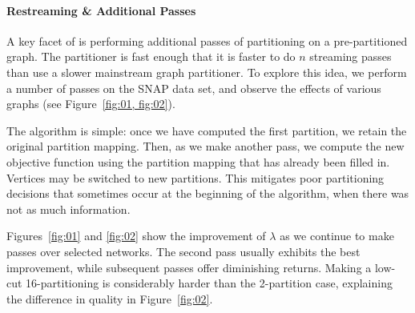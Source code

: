 
\paragraph{Restreaming \& Additional Passes}
A key facet of \ourmethod is performing additional passes of partitioning on a pre-partitioned graph. 
The partitioner is fast enough that it is faster to do $n$ streaming passes than use a slower mainstream graph partitioner.
To explore this idea, we perform a number of passes on the SNAP data set, and observe the effects of various graphs (see Figure~\ref{fig:01, fig:02}). 

The algorithm is simple: once we have computed the first partition, we retain the original partition mapping. 
Then, as we make another pass, we compute the new objective function using the partition mapping that has already been filled in. 
Vertices may be switched to new partitions. 
This mitigates poor partitioning decisions that sometimes occur at the beginning of the algorithm, when there was not as much information.

Figures~\ref{fig:01} and \ref{fig:02} show the improvement of $\lambda$ as we continue to make passes over selected networks. 
The second pass usually exhibits the best improvement, while subsequent passes offer diminishing returns.
Making a low-cut 16-partitioning is considerably harder than the 2-partition case, explaining the difference in quality in Figure~\ref{fig:02}.





